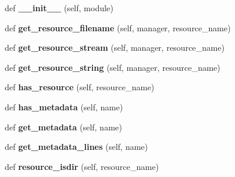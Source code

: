 \begin{DoxyCompactItemize}
\item 
\mbox{\label{classpkg__resources_1_1_null_provider_a7812e3926f7b0ab60ce1a83d685f91cf}} 
def {\bfseries \+\_\+\+\_\+init\+\_\+\+\_\+} (self, module)
\item 
\mbox{\label{classpkg__resources_1_1_null_provider_a1b477013656b7e7ec86d914bf51068da}} 
def {\bfseries get\+\_\+resource\+\_\+filename} (self, manager, resource\+\_\+name)
\item 
\mbox{\label{classpkg__resources_1_1_null_provider_ab8e610dad60b34272be032178b8c1e47}} 
def {\bfseries get\+\_\+resource\+\_\+stream} (self, manager, resource\+\_\+name)
\item 
\mbox{\label{classpkg__resources_1_1_null_provider_a5f92ab9a9056e307359f7cf348bb069f}} 
def {\bfseries get\+\_\+resource\+\_\+string} (self, manager, resource\+\_\+name)
\item 
\mbox{\label{classpkg__resources_1_1_null_provider_a34bb6a57b35a7b35dcadf2558333e152}} 
def {\bfseries has\+\_\+resource} (self, resource\+\_\+name)
\item 
\mbox{\label{classpkg__resources_1_1_null_provider_a670947a5ce4a05cbae651365c5294bbc}} 
def {\bfseries has\+\_\+metadata} (self, name)
\item 
\mbox{\label{classpkg__resources_1_1_null_provider_ac8f8f36f17bcd8a5e9e0621446ec4e6b}} 
def {\bfseries get\+\_\+metadata} (self, name)
\item 
\mbox{\label{classpkg__resources_1_1_null_provider_a3ea4f5544efb05812dea1035eb5643a3}} 
def {\bfseries get\+\_\+metadata\+\_\+lines} (self, name)
\item 
\mbox{\label{classpkg__resources_1_1_null_provider_af31acf6ad0520ee29b7713e2ad331a1a}} 
def {\bfseries resource\+\_\+isdir} (self, resource\+\_\+name)

\end{DoxyCompactItemize}
